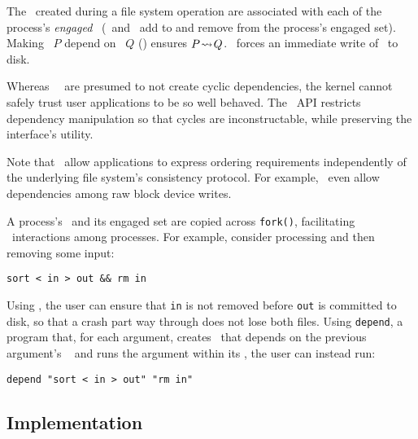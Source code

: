 The \chdescs\ created during a file system operation are associated
with each of the process's \emph{engaged} \opgroups\ (\pgEngage\ and
\pgDisengage\ add to and remove from the process's engaged set).
%
Making \opgroup\ $P$ depend on \opgroup\ $Q$ (\pgDepend)
ensures \(P\! \leadsto\! Q\).
%
\pgSync\ forces an immediate write of \anopgroup\ to disk.

Whereas \Kudos\ \modules\ are presumed to not create cyclic
dependencies, the kernel cannot safely trust user applications to be
so well behaved.
%
The \opgroup\ API restricts dependency manipulation so that cycles are
inconstructable, while preserving the interface's utility.

Note that \opgroups\ allow applications to express ordering
requirements independently of the underlying file system's consistency
protocol.
%
For example, \opgroups\ even allow dependencies among raw block device
writes.

A process's \opgroups\ and its engaged set are copied across \texttt{fork()},
facilitating \opgroup\ interactions among processes.
%
For example, consider processing and then removing some input:
%
\vspace{-0.5\baselineskip}
\begin{center}
\begin{small}
\verb+sort < in > out && rm in+
\end{small}
\end{center}
\vspace{-0.5\baselineskip}
%
Using \opgroups, the user can ensure that \texttt{in} is not removed
before \texttt{out} is committed to disk, so that a crash part way
through does not lose both files.
%
Using \texttt{depend}, a program that, for each argument,
%
creates \anopgroup\ that depends on the previous argument's \opgroup\
%
and runs the argument within its \opgroup,
%
the user can instead run:
%
\vspace{-0.5\baselineskip}
\begin{center}
\begin{small}
\verb+depend "sort < in > out" "rm in"+
\end{small}
\end{center}
\vspace{-0.5\baselineskip}


\subsection{Implementation}
\label{sec:opgroup:implementation}

